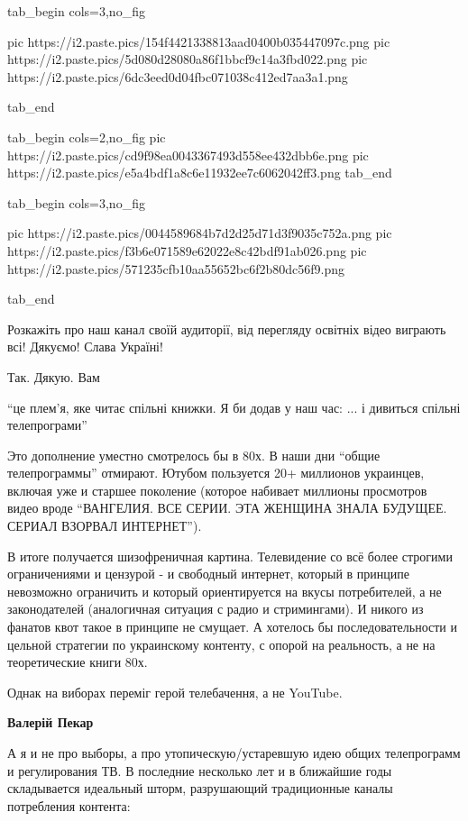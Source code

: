 \begin{itemize}
\ifcmt
  tab_begin cols=3,no_fig

     pic https://i2.paste.pics/154f4421338813aad0400b035447097c.png
		 pic https://i2.paste.pics/5d080d28080a86f1bbcf9c14a3fbd022.png
		 pic https://i2.paste.pics/6dc3eed0d04fbc071038c412ed7aa3a1.png

  tab_end

  tab_begin cols=2,no_fig
	   pic https://i2.paste.pics/cd9f98ea0043367493d558ee432dbb6e.png
		 pic https://i2.paste.pics/e5a4bdf1a8c6e11932ee7c6062042ff3.png
  tab_end

  tab_begin cols=3,no_fig

		 pic https://i2.paste.pics/0044589684b7d2d25d71d3f9035c752a.png
		 pic https://i2.paste.pics/f3b6e071589e62022e8c42bdf91ab026.png
		 pic https://i2.paste.pics/571235cfb10aa55652bc6f2b80dc56f9.png

  tab_end
\fi

Розкажіть про наш канал своїй аудиторії, від перегляду освітніх відео виграють всі!
Дякуємо!
Слава Україні!

Так. Дякую. Вам


\enquote{це плем'я, яке читає спільні книжки. Я би додав у наш час: ... і дивиться
спільні телепрограми}

Это дополнение уместно смотрелось бы в 80х. В наши дни \enquote{общие телепрограммы}
отмирают. Ютубом пользуется 20+ миллионов украинцев, включая уже и старшее
поколение (которое набивает миллионы просмотров видео вроде \enquote{ВАНГЕЛИЯ. ВСЕ
СЕРИИ. ЭТА ЖЕНЩИНА ЗНАЛА БУДУЩЕЕ. СЕРИАЛ ВЗОРВАЛ ИНТЕРНЕТ}).

В итоге получается шизофреничная картина. Телевидение со всё более строгими
ограничениями и цензурой - и свободный интернет, который в принципе невозможно
ограничить и который ориентируется на вкусы потребителей, а не законодателей
(аналогичная ситуация с радио и стримингами). И никого из фанатов квот такое в
принципе не смущает. А хотелось бы последовательности и цельной стратегии по
украинскому контенту, с опорой на реальность, а не на теоретические книги 80х.

\begin{itemize} %
Однак на виборах переміг герой телебачення, а не YouTube.

\textbf{Валерій Пекар} 

А я и не про выборы, а про утопическую/устаревшую идею общих телепрограмм и
регулирования ТВ. В последние несколько лет и в ближайшие годы складывается
идеальный шторм, разрушающий традиционные каналы потребления контента:


\end{itemize}
\end{itemize}
